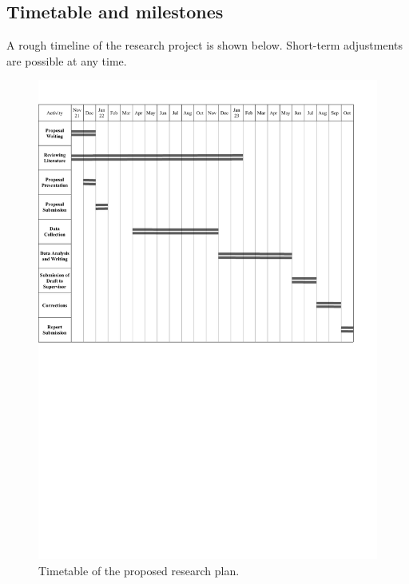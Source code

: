 \documentclass[12pt]{article}
\begin{document}
\subsection{Timetable and milestones}
A rough timeline of the research project is shown below. Short-term adjustments are possible at any time.

\begin{figure}[h]
\includegraphics[width=\textwidth,keepaspectratio]{Timetable2.pdf}
\caption{Timetable of the proposed research plan.}
\end{figure}
\end{document}
